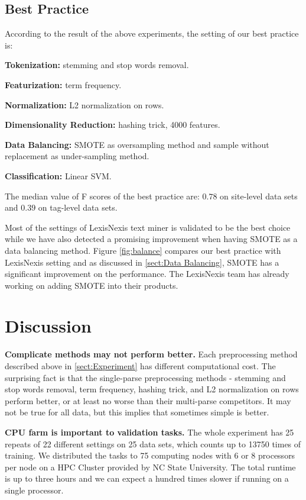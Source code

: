 \documentclass{sig-alternate-05-2015}
\newcommand{\tion}[1]{\textsection\ref{sect:#1}}
\begin{document}
\subsection{Best Practice}

According to the result of the above experiments, the setting of our best practice is:

\textbf{Tokenization:} stemming and stop words removal.

\textbf{Featurization:} term frequency.

\textbf{Normalization:} L2 normalization on rows.

\textbf{Dimensionality Reduction:} hashing trick, 4000 features.

\textbf{Data Balancing:} SMOTE as oversampling method and sample without replacement as under-sampling method.

\textbf{Classification:} Linear SVM.

The median value of F scores of the best practice are: $0.78$ on site-level data sets and $0.39$ on tag-level data sets. 

Most of the settings of LexisNexis text miner is validated to be the best choice while we have also detected a promising improvement when having SMOTE as a data balancing method. Figure \ref{fig:balance} compares our best practice with LexisNexis setting and as discussed in \tion{Data Balancing}, SMOTE has a significant improvement on the performance. The LexisNexis team has already working on adding SMOTE into their products. 


\section{Discussion}
\label{sect:Discussion}


\textbf{Complicate methods may not perform better. }Each preprocessing method described above in \tion{Experiment} has different computational cost. The surprising fact is that the single-parse preprocessing methods - stemming and stop words removal, term frequency, hashing trick, and L2 normalization on rows perform better, or at least no worse than their multi-parse competitors. It may not be true for all data, but this implies that sometimes simple is better.

\textbf{CPU farm is important to validation tasks.} The whole experiment has 25 repeats of 22 different settings on 25 data sets, which counts up to 13750 times of training. We distributed the tasks to 75 computing nodes with 6 or 8 processors per node on a HPC Cluster provided by NC State University. The total runtime is up to three hours and we can expect a hundred times slower if running on a single processor.
\end{document}
